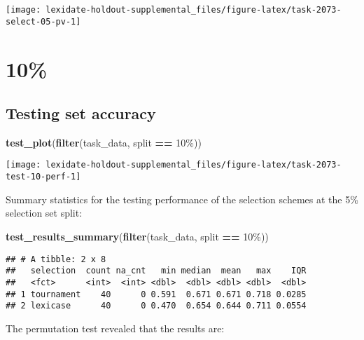 \documentclass[
]{book}
\newenvironment{Shaded}{\begin{snugshade}}{\end{snugshade}}
\newcommand{\FunctionTok}[1]{\textcolor[rgb]{0.13,0.29,0.53}{\textbf{#1}}}
\newcommand{\NormalTok}[1]{#1}
\newcommand{\SpecialCharTok}[1]{\textcolor[rgb]{0.81,0.36,0.00}{\textbf{#1}}}
\newcommand{\StringTok}[1]{\textcolor[rgb]{0.31,0.60,0.02}{#1}}
\begin{document}
\texttt{[image: lexidate-holdout-supplemental\_files/figure-latex/task-2073-select-05-pv-1]}

\hypertarget{section-41}{%
\section{10\%}\label{section-41}}

\hypertarget{testing-set-accuracy-41}{%
\subsection{Testing set accuracy}\label{testing-set-accuracy-41}}

\begin{Shaded}
\begin{Highlighting}[]
\FunctionTok{test\_plot}\NormalTok{(}\FunctionTok{filter}\NormalTok{(task\_data, split }\SpecialCharTok{==} \StringTok{\textquotesingle{}10\%\textquotesingle{}}\NormalTok{))}
\end{Highlighting}
\end{Shaded}

\texttt{[image: lexidate-holdout-supplemental\_files/figure-latex/task-2073-test-10-perf-1]}

Summary statistics for the testing performance of the selection schemes at the 5\% selection set split:

\begin{Shaded}
\begin{Highlighting}[]
\FunctionTok{test\_results\_summary}\NormalTok{(}\FunctionTok{filter}\NormalTok{(task\_data, split }\SpecialCharTok{==} \StringTok{\textquotesingle{}10\%\textquotesingle{}}\NormalTok{))}
\end{Highlighting}
\end{Shaded}

\begin{verbatim}
## # A tibble: 2 x 8
##   selection  count na_cnt   min median  mean   max    IQR
##   <fct>      <int>  <int> <dbl>  <dbl> <dbl> <dbl>  <dbl>
## 1 tournament    40      0 0.591  0.671 0.671 0.718 0.0285
## 2 lexicase      40      0 0.470  0.654 0.644 0.711 0.0554
\end{verbatim}

The permutation test revealed that the results are:
\end{document}
